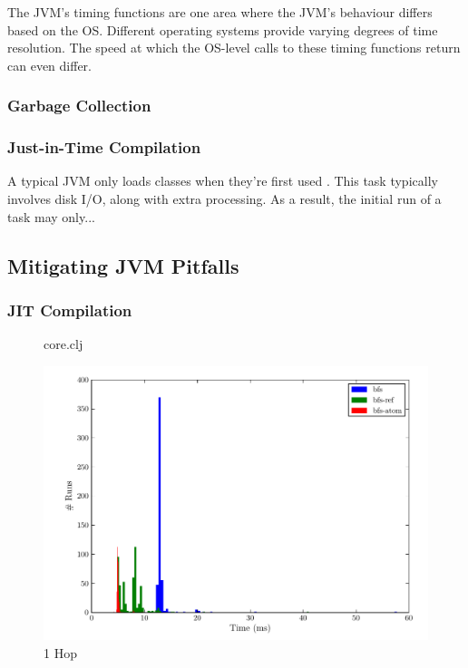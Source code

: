 \documentclass[12pt,letterpaper,oneside,notitlepage]{report}
\theoremstyle{definition}
\begin{document}
          The JVM's timing functions are one area where the JVM's behaviour differs based on the OS.  Different operating systems provide varying degrees of time resolution.  The speed at which the OS-level calls to these timing functions return can even differ.
        
        \subsubsection{Garbage Collection}
      
        \subsubsection{Just-in-Time Compilation}
          A typical JVM only loads classes when they're first used \cite{rob-java-bench-08}.  This task typically involves disk I/O, along with extra processing.  As a result, the initial run of a task may only...
      
      \subsection{Mitigating JVM Pitfalls}
        \subsubsection{JIT Compilation}
          \begin{figure}[ht!]
      
            \caption{core.clj}
          \end{figure}
    
    \begin{figure}[!ht]
      \centering
      \includegraphics[scale=0.85]{1_hops}
      \caption{1 Hop}
      \label{fig:perf-1-hop}
    \end{figure}
    
\end{document}
